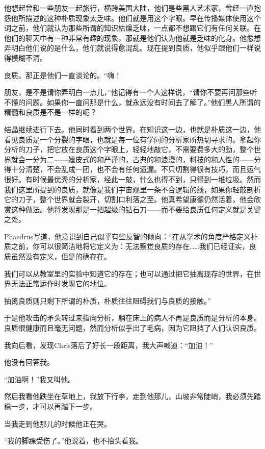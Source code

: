 \documentclass[UTF8]{article}
\begin{document}
\par 他想起曾和一些朋友一起旅行，横跨美国大陆，他们是些黑人艺术家，曾经一直抱怨他所描述的这种朴质现象太乏味。他们就是用这个字眼。早在传播媒体使用这个词之前，他们就认为那些所谓的知识枯燥乏味，一点都不想跟它们有任何关联。在他们的聊天中有一种非常有趣的现象，那就是他们认为他就是乏味的化身。他愈想弄明白他们说的是什么，他们就说得愈混乱。现在提到良质，他似乎跟他们一样说得模糊不清。
\par 良质。那正是他们一直谈论的。“嗨！
\par 朋友，是不是请你弄明白一点儿，”他记得有一个人这样说，“请你不要再问那些听不懂的问题。如果你一直问那是什么，就永远没有时间去了解了。”他们黑人所谓的精髓和良质是不是一样的呢？
\par 结晶继续进行下去。他同时看到两个世界。在知识这一边，也就是朴质这一边，他看见良质是一个分裂的字眼，也就是每一位有学问的分析家所热切寻求的。拿起你分析的刀子，把它放在良质这个字眼上，轻轻地敲它，不需要费多大的劲，整个世界就会一分为二——嬉皮式的和严谨的，古典的和浪漫的，科技的和人性的——分得十分清楚，不会乱成一团，也不会有任何遗漏。不只切割得很有技巧，而且运气很好。有时候最优秀的分析家，经此一敲，什么也得不到，只得到一堆垃圾。然而我们这里所提到的良质，就像是我们宇宙观里一条不合逻辑的线，如果你轻敲剖析它的刀子，整个世界就会裂开，切割口利落之至。他真希望康德仍然活着，他会欣赏这种做法。他将发现那是一把超级的钻石刀——而不要给良质任何定义就是关键之处。
\par Phaedrus写道，他意识到自己似乎有些反智的倾向：“在从学术的角度严格定义朴质之前，你可以很简洁地将它定义为：无法察觉良质的存在……我们已经证实，良质虽然没有定义，但是的确存在。
\par 我们可以从教室里的实验中知道它的存在；也可以通过把它抽离现存的世界，在世界无法正常运作时发现它的地位。
\par 抽离良质则只剩下所谓的朴质，朴质往往阻碍我们与良质的接触。”
\par 于是他攻击的矛头转过来指向分析，躺在床上的病人不再是良质而是分析的本身。良质很健康而且毫无问题，然而分析似乎出了毛病，因为它阻挡了人们认识良质。
\par 我向后看，发现Chris落后了好长一段距离，我大声喊道：“加油！”
\par 他没有回答我。
\par “加油啊！”我又叫他。
\par 然后我看他跌坐在草地上，我放下行李，走到他那儿，山坡非常陡峭，我必须先踏稳一步，才可以再踏下一步。
\par 当我走到他那儿的时候他正在哭。
\par “我的脚踝受伤了。”他说着，也不抬头看我。
\end{document}
